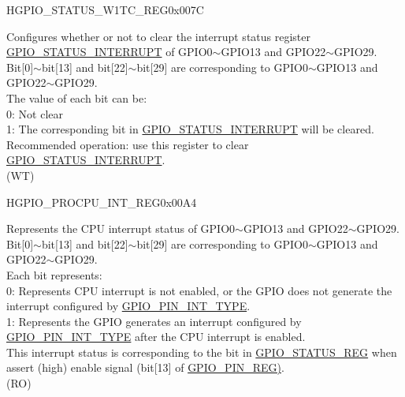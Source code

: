 \begin{register}{H}{GPIO\_STATUS\_W1TC\_REG}{0x007C}\label{regdesc:GPIOSTATUSW1TCREG}
%
\regnewline%
\begin{regdesc}\begin{reglist}
\label{fielddesc:GPIOSTATUSW1TC}\item [GPIO\_STATUS\_W1TC] Configures whether or not to clear the interrupt status register \hyperref[fielddesc:GPIOSTATUSINTERRUPT]{GPIO\_STATUS\_INTERRUPT} of GPIO0$\sim$GPIO13 and GPIO22$\sim$GPIO29.\\ 
Bit[0]$\sim$bit[13] and bit[22]$\sim$bit[29] are corresponding to GPIO0$\sim$GPIO13 and GPIO22$\sim$GPIO29.\\
The value of each bit can be:\\
0: Not clear\\
1: The corresponding bit in \hyperref[fielddesc:GPIOSTATUSINTERRUPT]{GPIO\_STATUS\_INTERRUPT} will be cleared. \\
Recommended operation: use this register to clear \hyperref[fielddesc:GPIOSTATUSINTERRUPT]{GPIO\_STATUS\_INTERRUPT}.\\
(WT)
\end{reglist}\end{regdesc}
\end{register}


\begin{register}{H}{GPIO\_PROCPU\_INT\_REG}{0x00A4}\label{regdesc:GPIOPROCPUINTREG}
%
\regnewline%
\begin{regdesc}\begin{reglist}
\label{fielddesc:GPIOPROCPUINT}\item [GPIO\_PROCPU\_INT] Represents the CPU interrupt status of GPIO0$\sim$GPIO13 and GPIO22$\sim$GPIO29.\\ 
Bit[0]$\sim$bit[13] and bit[22]$\sim$bit[29] are corresponding to GPIO0$\sim$GPIO13 and GPIO22$\sim$GPIO29.\\
Each bit represents:\\
0: Represents CPU interrupt is not enabled, or the GPIO does not generate the interrupt configured by \hyperref[fielddesc:GPIOPINNINTTYPE]{GPIO\_PIN\_INT\_TYPE}.\\
1: Represents the GPIO generates an interrupt configured by \hyperref[fielddesc:GPIOPINNINTTYPE]{GPIO\_PIN\_INT\_TYPE} after the CPU interrupt is enabled.\\
This interrupt status is corresponding to the bit in \hyperref[regdesc:GPIOSTATUSREG]{GPIO\_STATUS\_REG} when assert (high) enable signal (bit[13] of \hyperref[regdesc:GPIOPINNREG]{GPIO\_PIN\_REG)}. \\ (RO)
\end{reglist}\end{regdesc}
\end{register}


